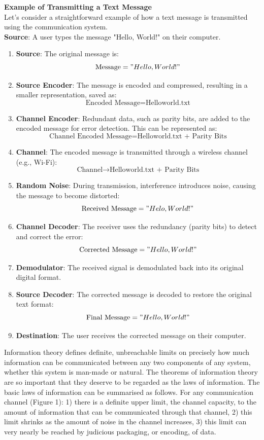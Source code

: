 \documentclass[12pt, oneside]{book}
\begin{document}
\textbf{Example of Transmitting a Text Message}\\
Let's consider a straightforward example of how a text message is transmitted using the communication system.\\
\textbf{Source}: A user types the message "Hello, World!" on their computer.\\
\begin{enumerate}[label=\arabic*.]
	\item \textbf{Source}: 
	The original message is: 
	\[\text{Message} = "Hello, World!"\]
	\item \textbf{Source Encoder}: 
	The message is encoded and compressed, resulting in a smaller representation, saved as:
	\[\text{Encoded Message} = \text{Helloworld.txt}\]
	\item \textbf{Channel Encoder}: 
	Redundant data, such as parity bits, are added to the encoded message for error detection. This can be represented as:
	\[	\text{Channel Encoded Message} = \text{Helloworld.txt + Parity Bits}\]
	\item \textbf{Channel}: 
	The encoded message is transmitted through a wireless channel (e.g., Wi-Fi):
	\[\text{Channel} \rightarrow \text{Helloworld.txt + Parity Bits}\]
	\item \textbf{Random Noise}: 
	During transmission, interference introduces noise, causing the message to become distorted:
	\[\text{Received Message} = "Helo, World!" \]
	
	\item \textbf{Channel Decoder}: 
	The receiver uses the redundancy (parity bits) to detect and correct the error:
	\[\text{Corrected Message} = "Hello, World!"\]
	
	\item \textbf{Demodulator}: 
	The received signal is demodulated back into its original digital format.
	
	\item \textbf{Source Decoder}: 
	The corrected message is decoded to restore the original text format:
	\[\text{Final Message} = "Hello, World!"\]
	
	\item \textbf{Destination}: 
	The user receives the corrected message on their computer.
\end{enumerate}
Information theory defines definite, unbreachable limits on precisely how much information can be communicated between any two components of any system, whether this system is man-made or natural. The theorems of information theory are so important that they deserve to be regarded as the laws of information. The basic laws of information can be summarised as follows. For any communication channel (Figure 1): 1) there is a definite upper limit, the channel capacity, to the amount of information that can be communicated through that channel, 2) this limit shrinks as the amount of noise in the channel increases, 3) this limit can very nearly be reached by judicious packaging, or encoding, of data.\\
\end{document}
